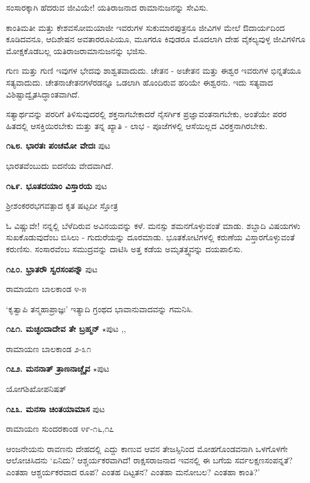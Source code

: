 ಸಂಸಾರಕ್ಕಾಗಿ ಹೆದರುವ ಜೀವಿಯೇ! ಯತಿರಾಜನಾದ ರಾಮಾನುಜನನ್ನು ಸೇವಿಸು.

ಕಾಂತಿಮತೀ ಮತ್ತು ಕೇಶವಸೋಮಯಾಜೀ ಇವರುಗಳ ಸುಕುಮಾರಪುತ್ರನೂ ಜೀವಿಗಳ ಮೇಲೆ ಔದಾರ್ಯದಿಂದ ಕೂಡಿದವನೂ, ಆದಿಶೇಷನ ಅವತಾರರೂಪಿಯೂ, ಮೂಗರೂ ಕಿವುಡರೂ ಮೊದಲಾಗಿ ದೇಹ ವೈಕಲ್ಯವುಳ್ಳ ಜೀವಿಗಳಿಗೂ ಮೋಕ್ಷಕೊಡಬಲ್ಲ ಯತಿರಾಜರಾಮಾನುಜನನ್ನು ಭಜಿಸು.

ಗುಣ ಮತ್ತು ಗುಣಿ ಇವುಗಳ ಭೇದವು ಶಾಶ್ವತವಾದುದು. ಚೇತನ - ಅಚೇತನ ಮತ್ತು ಈಶ್ವರ ಇವರುಗಳ ಭಿನ್ನತೆಯೂ ಸತ್ಯವಾದುದು. ಚೇತನಾಚೇತನಗಳೆರಡನ್ನೂ ಒಡಲಾಗಿ ಹೊಂದಿರುವ ಹರಿಯೇ ಈಶ್ವರನು. ಇದು ಸತ್ಯವಾದ ವಿಶಿಷ್ಟಾದ್ವೈತಸಿದ್ಧಾಂತವಾಗಿದೆ.

ಸತ್ಯಾರ್ಥವನ್ನು ಪರರಿಗೆ ತಿಳಿಸುವುದರಲ್ಲಿ ಶಕ್ತನಾಗಬೇಕಾದರೆ ನೈಸರ್ಗಿಕ ಪ್ರಜ್ಞಾವಂತನಾಗಬೇಕು, ಅಂತೆಯೇ ಪರರ ಹಿತದಲ್ಲಿ ಆಸಕ್ತಿಯಿರಬೇಕು ಮತ್ತು ತನ್ನ ಖ್ಯಾತಿ - ಲಾಭ - ಪೂಜೆಗಳಲ್ಲಿ ಆಸೆಯಿಲ್ಲದ ವಿರಕ್ತನಾಗಿರಬೇಕು.

\medskip
\noindent\textbf{೧೬೮. ಭಾರತಃ ಪಂಚಮೋ ವೇದಃ} \hfill ಪುಟ \pageref{122}

ಭಾರತವೆಂಬುದು ಐದನೆಯ ವೇದವಾಗಿದೆ.

\medskip
\noindent\textbf{೧೬೯. ಭೂತದಯಾಂ ವಿಸ್ತಾರಯ} \hfill ಪುಟ \pageref{115b}

\hfill ಶ್ರೀಶಂಕರರಭಗವತ್ಪಾದ ಕೃತ ಷಟ್ಪದೀ ಸ್ತೋತ್ರ

ಓ ವಿಷ್ಣುವೇ! ನನ್ನಲ್ಲಿ ಬೆಳೆದಿರುವ ಅವಿನಯವನ್ನು ಕಳೆ. ಮನಸ್ಸು ಶಮನಗೊಳ್ಳುವಂತೆ ಮಾಡು. ಶಬ್ದಾದಿ ವಿಷಯಗಳು ಸುಖಕೊಡುವುದೆಂಬ ಬಿಸಿಲು - ಗುದುರೆಯನ್ನು ದೂರಮಾಡು. ಭೂತಕೋಟಿಗಳಲ್ಲಿ ಕರುಣೆಯ ವಿಸ್ತಾರಗೊಳ್ಳುವಂತೆ ಕರುಣಿಸು. ಸಂಸಾರವೆಂಬ ಸಮುದ್ರವನ್ನು ದಾಟಿಸಿ ಅತ್ತ ಕಡೆಯ ಅಮೃತತ್ತ್ವವನ್ನು ದಯಪಾಲಿಸು.

\medskip
\noindent\textbf{೧೭೦. ಭ್ರಾತರೌ ಸ್ವರಸಂಪನ್ನೌ} \hfill ಪುಟ \pageref{250b}

\hfill ರಾಮಾಯಣ ಬಾಲಕಾಂಡ ೪-೫

`ಕೃತ್ವಾಪಿ ತನ್ಮಹಾಪ್ರಾಜ್ಞಃ' ಇತ್ಯಾದಿ ಗ್ರಂಥದ ಭಾವಾನುವಾದವನ್ನು ಗಮನಿಸಿ.

\medskip
\noindent\textbf{೧೭೧. ಮಚ್ಛಂದಾದೇವ ತೇ ಬ್ರಹ್ಮನ್} $\star$\hfill ಪುಟ \pageref{21a},\pageref{203b},\pageref{250c}

\hfill ರಾಮಾಯಣ ಬಾಲಕಾಂಡ ೨-೩೧

\medskip
\noindent\textbf{೧೭೨. ಮನನಾತ್ ತ್ರಾಣನಾಚ್ಚೈವ} $\star$\hfill ಪುಟ \pageref{10}

\hfill ಯೋಗಶಿಖೋಪನಿಷತ್

\medskip
\noindent\textbf{೧೭೩. ಮನಸಾ ಚಿಂತಯಾಮಾಸ} \hfill ಪುಟ \pageref{192}

\hfill ರಾಮಾಯಣ ಸುಂದರಕಾಂಡ ೪೯-೧೬,೧೭

ಆಂಜನೇಯನು ರಾವಣನು ದೇಹದಲ್ಲಿ ಎದ್ದು ಕಾಣುವ ಆವನ ತೇಜಸ್ಸಿನಿಂದ ಮೋಹಗೊಂಡವನಾಗಿ ಒಳಗೊಳಗೇ ಆಲೋಚಿಸಿದನು `ಏನಿದು? ಆಶ್ಚರ್ಯಕರವಾಗಿದೆ! ರಾಕ್ಷಸರಾಜನಾದ ಇವನಲ್ಲಿ ಈ ಬಗೆಯ ಸರ್ವಲಕ್ಷಣಸಂಪನ್ನತೆ? ಎಂತಹಾ ಆಶ್ಚರ್ಯಕರವಾದ ರೂಪ? ಎಂತಹ ದಿಟ್ಟತನ? ಎಂತಹಾ ಮನೋಬಲ? ಎಂತಹಾ ಕಾಂತಿ?'

